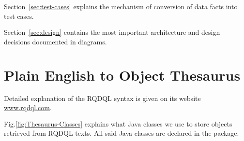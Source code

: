 \documentclass[12pt,oneside,letterpaper]{article}
\begin{document}
    Section~\ref{sec:test-cases} explains the mechanism of conversion
    of data facts into test cases.

    Section~\ref{sec:design} contains the most important architecture
    and design decisions documented in diagrams.





\section{Plain English to Object Thesaurus}
\label{sec:to-objects}

    Detailed explanation of the RQDQL syntax is given on its
    website \href{http://www.rqdql.com}{www.rqdql.com}.

    Fig.\ref{fig:Thesaurus-Classes} explains what Java classes we use
    to store objects retrieved from RQDQL texts. All said Java classes
    are declared in the
     package.
\end{document}
